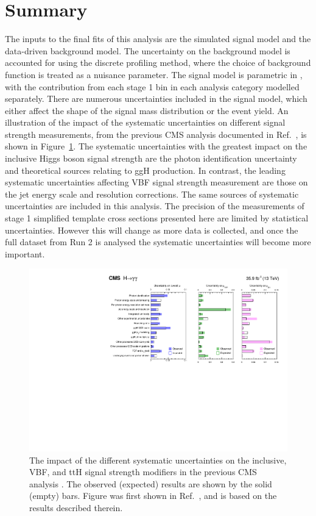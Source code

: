 \section{Summary}

The inputs to the final fits of this analysis are the simulated signal model 
and the data-driven background model.
The uncertainty on the background model is accounted for using the discrete profiling method, 
where the choice of background function is treated as a nuisance parameter.
The signal model is parametric in \mH, 
with the contribution from each stage 1 bin in each analysis category modelled separately.
There are numerous uncertainties included in the signal model, 
which either affect the shape of the signal mass distribution 
or the event yield.
An illustration of the impact of the systematic uncertainties 
on different signal strength measurements, 
from the previous CMS \Hgg analysis documented in Ref.~\cite{HIG-16-040}, 
is shown in Figure~\ref{fig:sigbkg_systematics}.
The systematic uncertainties with the greatest impact on the inclusive Higgs boson signal strength
are the photon identification uncertainty and theoretical sources relating to ggH production.
In contrast, the leading systematic uncertainties affecting VBF signal strength measurement 
are those on the jet energy scale and resolution corrections.
The same sources of systematic uncertainties are included in this analysis.
The precision of the measurements of stage 1 simplified template cross sections presented here
are limited by statistical uncertainties.
However this will change as more data is collected, 
and once the full dataset from Run 2 is analysed 
the systematic uncertainties will become more important.

\begin{figure}[hptb]
  \centering
  \includegraphics[width=\textwidth]{Figures/SigBkg/SystematicsTable.pdf}
  \caption[The impact of systematic uncertainties on signal strength measurements in Ref.~\cite{HIG-16-040}.]
  {
    The impact of the different systematic uncertainties on the inclusive, VBF, and ttH 
    signal strength modifiers in the previous CMS \Hgg analysis \cite{HIG-16-040}.
    The observed (expected) results are shown by the solid (empty) bars.
    Figure was first shown in Ref.~\cite{HIG-16-040}, 
    and is based on the results described therein.
  }
  \label{fig:sigbkg_systematics}
\end{figure}
